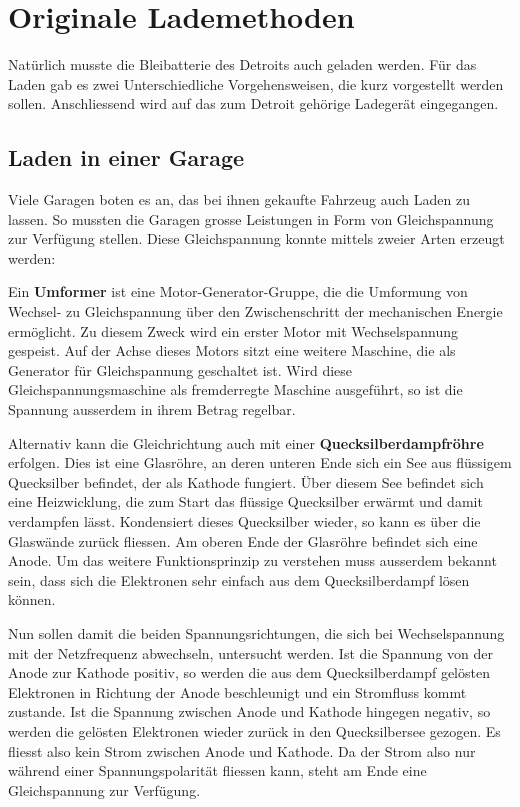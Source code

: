 \section{Originale Lademethoden}

Natürlich musste die Bleibatterie des Detroits auch geladen werden. Für das Laden gab es zwei Unterschiedliche Vorgehensweisen, die kurz vorgestellt werden sollen. Anschliessend wird auf das zum Detroit gehörige Ladegerät eingegangen.

\subsection{Laden in einer Garage}
Viele Garagen boten es an, das bei ihnen gekaufte Fahrzeug auch Laden zu lassen. So mussten die Garagen grosse Leistungen in Form von Gleichspannung zur Verfügung stellen. Diese Gleichspannung konnte mittels zweier Arten erzeugt werden:

Ein \textbf{Umformer} ist eine Motor-Generator-Gruppe, die die Umformung von Wechsel- zu Gleichspannung über den Zwischenschritt der mechanischen Energie ermöglicht. Zu diesem Zweck wird ein erster Motor mit Wechselspannung gespeist. Auf der Achse dieses Motors sitzt eine weitere Maschine, die als Generator für Gleichspannung geschaltet ist. Wird diese Gleichspannungsmaschine als fremderregte Maschine ausgeführt, so ist die Spannung ausserdem in ihrem Betrag regelbar.

Alternativ kann die Gleichrichtung auch mit einer \textbf{Quecksilberdampfröhre} erfolgen. Dies ist eine Glasröhre, an deren unteren Ende sich ein See aus flüssigem Quecksilber befindet, der als Kathode fungiert. Über diesem See befindet sich eine Heizwicklung, die zum Start das flüssige Quecksilber erwärmt und damit verdampfen lässt. Kondensiert dieses Quecksilber wieder, so kann es über die Glaswände zurück fliessen. Am oberen Ende der Glasröhre befindet sich eine Anode. Um das weitere Funktionsprinzip zu verstehen muss ausserdem bekannt sein, dass sich die Elektronen sehr einfach aus dem Quecksilberdampf lösen können.

Nun sollen damit die beiden Spannungsrichtungen, die sich bei Wechselspannung mit der Netzfrequenz abwechseln, untersucht werden. Ist die Spannung von der Anode zur Kathode positiv, so werden die aus dem Quecksilberdampf gelösten Elektronen in Richtung der Anode beschleunigt und ein Stromfluss kommt zustande. Ist die Spannung zwischen Anode und Kathode hingegen negativ, so werden die gelösten Elektronen wieder zurück in den Quecksilbersee gezogen. Es fliesst also kein Strom zwischen Anode und Kathode. Da der Strom also nur während einer Spannungspolarität fliessen kann, steht am Ende eine Gleichspannung zur Verfügung.

